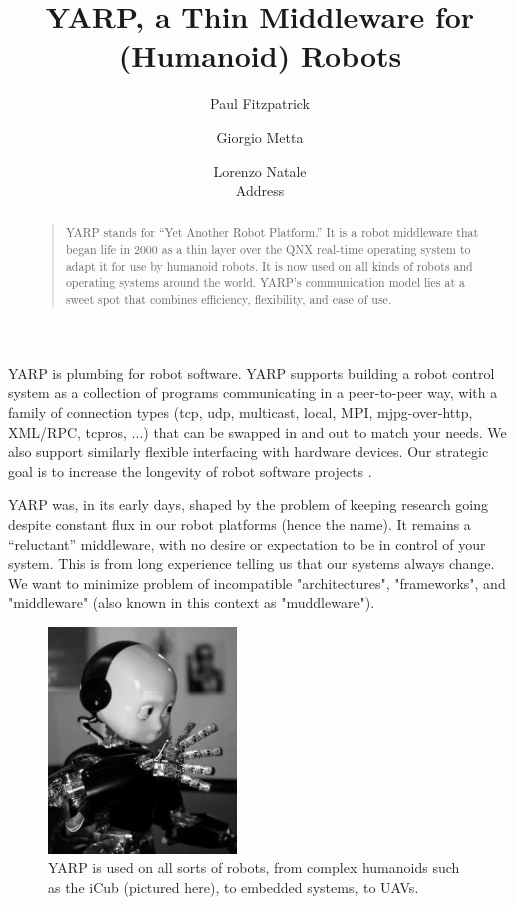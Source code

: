 \documentclass[letterpaper]{article}
\title{YARP, a Thin Middleware for (Humanoid) Robots}
\author{Paul Fitzpatrick \and Giorgio Metta \and Lorenzo Natale \\
Address}
\begin{document}
 
\maketitle
\begin{abstract}
\begin{quote}

YARP stands for ``Yet Another Robot Platform.''  It is a robot
middleware that began life in 2000 as a thin layer over the QNX
real-time operating system to adapt it for use by humanoid robots.  It
is now used on all kinds of robots and operating systems around the
world.  YARP's communication model lies at a sweet spot that combines
efficiency, flexibility, and ease of use.

\end{quote}
\end{abstract}

\noindent 

YARP is plumbing for robot software.  YARP supports building a robot
control system as a collection of programs communicating in a
peer-to-peer way, with a family of connection types (tcp, udp,
multicast, local, MPI, mjpg-over-http, XML/RPC, tcpros, ...) that can
be swapped in and out to match your needs.  We also support similarly
flexible interfacing with hardware devices. Our strategic goal is to
increase the longevity of robot software projects
\cite{fitzpatrick08towards}.

YARP was, in its early days, shaped by the problem of keeping research
going despite constant flux in our robot platforms (hence the name).
It remains a ``reluctant'' middleware, with no desire or expectation
to be in control of your system.  This is from long experience telling
us that our systems always change.  
We want to minimize problem
of incompatible "architectures", "frameworks", and "middleware" (also
known in this context as "muddleware").

\begin{figure}
\centerline{\includegraphics[width=5cm]{icub.jpg}}
\caption{YARP is used on all sorts of robots,
from complex humanoids such as the iCub (pictured here),
to embedded systems, to UAVs.
} 
\end{figure}
\end{document}
